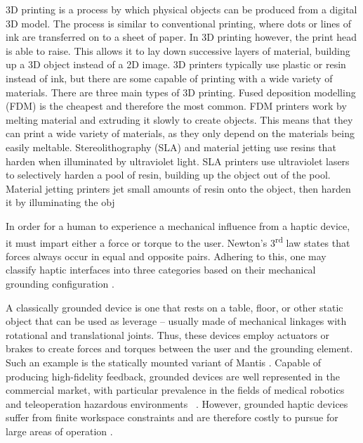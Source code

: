 \documentclass[a4paper]{article}
\begin{document}
\bigskip


\bigskip

3D printing is a process by which physical objects can be produced from a digital 3D model. The process is similar to
conventional printing, where dots or lines of ink are transferred on to a sheet of paper. In 3D printing however, the
print head is able to raise. This allows it to lay down successive layers of material, building up a 3D object instead
of a 2D image. 3D printers typically use plastic or resin instead of ink, but there are some capable of printing with a
wide variety of materials. There are three main types of 3D printing. Fused deposition modelling (FDM) is the cheapest
and therefore the most common. FDM printers work by melting material and extruding it slowly to create objects. This
means that they can print a wide variety of materials, as they only depend on the materials being easily meltable.
Stereolithography (SLA) and material jetting use resins that harden when illuminated by ultraviolet light. SLA printers
use ultraviolet lasers to selectively harden a pool of resin, building up the object out of the pool. Material jetting
printers jet small amounts of resin onto the object, then harden it by illuminating the obj


\bigskip

In order for a human to experience a mechanical influence from a haptic device, it must impart either a force or torque
to the user. Newton's 3\textsuperscript{rd} law states that forces always occur in equal and opposite pairs. Adhering
to this, one may classify haptic interfaces into three categories based on their mechanical grounding configuration
\cite{CITATIONABi05l2057}. 

A classically grounded device is one that rests on a table, floor, or other static object that can be used as leverage
-- usually made of mechanical linkages with rotational and translational joints. Thus, these devices employ actuators
or brakes to create forces and torques between the user and the grounding element. Such an example is the statically
mounted variant of Mantis \cite{CITATIONGBa191l2057}. Capable of producing high-fidelity feedback, grounded devices are
well represented in the commercial market, with particular prevalence in the fields of medical robotics and
teleoperation hazardous environments \cite{CITATIONSAv16l2057}\ \cite{CITATIONIVi21l2057}. However, grounded haptic
devices suffer from finite workspace constraints and are therefore costly to pursue for large areas of operation
\cite{CITATIONVHa04l2057}.
\end{document}
